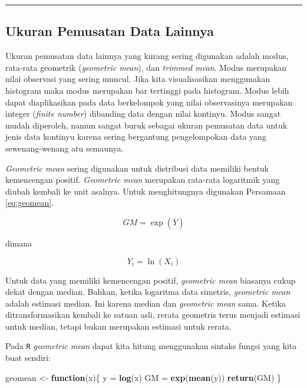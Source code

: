 \documentclass[]{book}
\newenvironment{Shaded}{\begin{snugshade}}{\end{snugshade}}
\newcommand{\KeywordTok}[1]{\textcolor[rgb]{0.13,0.29,0.53}{\textbf{#1}}}
\newcommand{\StringTok}[1]{\textcolor[rgb]{0.31,0.60,0.02}{#1}}
\newcommand{\ControlFlowTok}[1]{\textcolor[rgb]{0.13,0.29,0.53}{\textbf{#1}}}
\newcommand{\NormalTok}[1]{#1}
\begin{document}
\begin{center}\rule{0.5\linewidth}{\linethickness}\end{center}

\subsection{Ukuran Pemusatan Data
Lainnya}\label{ukuran-pemusatan-data-lainnya}

Ukuran pemusatan data lainnya yang kurang sering digunakan adalah modus,
rata-rata geometrik (\emph{geometric mean}), dan \emph{trimmed mean}.
Modus merupakan nilai observasi yang sering muncul. Jika kita
visualisasikan menggunakan histogram maka modus merupakan bar tertinggi
pada histogram. Modus lebih dapat diaplikasikan pada data berkelompok
yang nilai observasinya merupakan integer (\emph{finite number})
dibanding data dengan nilai kontinyu. Modus sangat mudah diperoleh,
namun sangat buruk sebagai ukuran pemusatan data untuk jenis data
kontinyu karena sering bergantung pengelompokan data yang
sewenang-wenang atu semaunya.

\emph{Geometric mean} sering digunakan untuk distribusi data memiliki
bentuk kemencengan positif. \emph{Geometric mean} merupakan rata-rata
logaritmik yang diubah kembali ke unit asalnya. Untuk menghitungnya
digunakan Persamaan \eqref{eq:geomean}.

\begin{equation}
  GM = \exp\left(\overline{Y}\right)
  \label{eq:geomean}
\end{equation}

dimana

\begin{equation}
  Y_i = \ln\left(X_i\right)
  \label{eq:geomean2}
\end{equation}

Untuk data yang memiliki kemencengan positif, \emph{geometric mean}
biasanya cukup dekat dengan median. Bahkan, ketika logaritma data
simetris, \emph{geometric mean} adalah estimasi median. Ini karena
median dan \emph{geometric mean} sama. Ketika ditransformasikan kembali
ke satuan asli, rerata geometris terus menjadi estimasi untuk median,
tetapi bukan merupakan estimasi untuk rerata.

Pada \texttt{R} \emph{geometric mean} dapat kita hitung menggunakan
sintaks fungsi yang kita buat sendiri:

\begin{Shaded}
\begin{Highlighting}[]
\NormalTok{geomean <-}\StringTok{ }\ControlFlowTok{function}\NormalTok{(x)\{}
\NormalTok{  y =}\StringTok{ }\KeywordTok{log}\NormalTok{(x)}
\NormalTok{  GM =}\StringTok{ }\KeywordTok{exp}\NormalTok{(}\KeywordTok{mean}\NormalTok{(y))}
  \KeywordTok{return}\NormalTok{(GM)}
\NormalTok{\}}
\end{Highlighting}
\end{Shaded}
\end{document}
